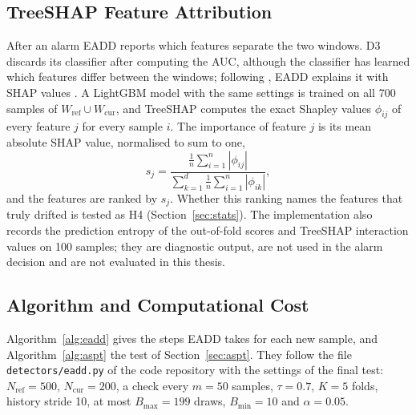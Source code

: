 \subsection{TreeSHAP Feature Attribution}
\label{sec:treeshap}
After an alarm EADD reports which features separate the two windows. D3 discards its classifier after computing the AUC, although the classifier has learned which features differ between the windows; following \citet{Maggio2021}, EADD explains it with SHAP values \citep{Lundberg2017}. A LightGBM model with the same settings is trained on all 700 samples of $W_{\mathrm{ref}} \cup W_{\mathrm{cur}}$, and TreeSHAP \citep{LundbergInteraction2020} computes the exact Shapley values \citep{Shapley1953} $\phi_{ij}$ of every feature $j$ for every sample $i$. The importance of feature $j$ is its mean absolute SHAP value, normalised to sum to one,
\begin{equation}
s_j = \frac{\frac{1}{n}\sum_{i=1}^{n} |\phi_{ij}|}{\sum_{k=1}^{d} \frac{1}{n}\sum_{i=1}^{n} |\phi_{ik}|},
\label{eq:shap-importance}
\end{equation}
and the features are ranked by $s_j$. Whether this ranking names the features that truly drifted is tested as H4 (Section~\ref{sec:stats}). The implementation also records the prediction entropy of the out-of-fold scores and TreeSHAP interaction values on 100 samples; they are diagnostic output, are not used in the alarm decision and are not evaluated in this thesis.

\subsection{Algorithm and Computational Cost}\label{sec:eadd-algorithm}
Algorithm~\ref{alg:eadd} gives the steps EADD takes for each new sample, and Algorithm~\ref{alg:aspt} the test of Section~\ref{sec:aspt}. They follow the file \texttt{detectors/eadd.py} of the code repository with the settings of the final test: $N_{\mathrm{ref}} = 500$, $N_{\mathrm{cur}} = 200$, a check every $m = 50$ samples, $\tau = 0.7$, $K = 5$ folds, history stride 10, at most $B_{\max} = 199$ draws, $B_{\min} = 10$ and $\alpha = 0.05$.

